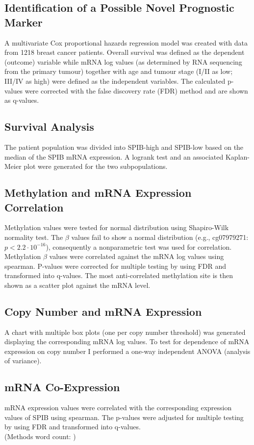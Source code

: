 \subsection{Identification of a Possible Novel Prognostic Marker}

A multivariate Cox proportional hazards regression model was created with data from 1218 breast cancer patients.
Overall survival was defined as the dependent (outcome) variable while mRNA log values (as determined by RNA sequencing from the primary tumour) together with age and tumour stage (I/II as low; III/IV as high) were defined as the independent variables.
The calculated p-values were corrected with the false discovery rate (FDR) method and are shown as q-values.

\subsection{Survival Analysis}

The patient population was divided into SPIB-high and SPIB-low based on the median of the SPIB mRNA expression.
A logrank test and an associated Kaplan-Meier plot were generated for the two subpopulations.

\subsection{Methylation and mRNA Expression Correlation}

Methylation values were tested for normal distribution using Shapiro-Wilk normality test.
The $\beta$ values fail to show a normal distribution (e.g., cg07979271: ${p < 2.2 \cdot 10^{-16}}$), consequently a nonparametric test was used for correlation.
Methylation $\beta$ values were correlated against the mRNA log values using spearman.
P-values were corrected for multiple testing by using FDR and transformed into q-values.
The most anti-correlated methylation site is then shown as a scatter plot against the mRNA level.

\subsection{Copy Number and mRNA Expression}

A chart with multiple box plots (one per copy number threshold) was generated displaying the corresponding mRNA log values.
To test for dependence of mRNA expression on copy number I performed a one-way independent ANOVA (analysis of variance).

\subsection{mRNA Co-Expression}

mRNA expression values were correlated with the corresponding expression values of SPIB using spearman.
The p-values were adjusted for multiple testing by using FDR and transformed into q-values.
\\
\endcountem
(Methods word count: \thewordcount{})